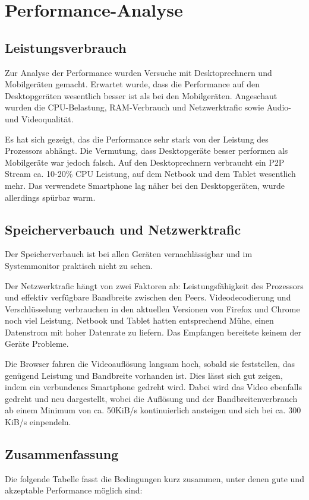 \chapter{Performance-Analyse}
	\section{Leistungsverbrauch}
		Zur Analyse der Performance wurden Versuche mit Desktoprechnern und Mobilgeräten gemacht. Erwartet wurde, dass die Performance auf den Desktopgeräten wesentlich besser ist als bei den Mobilgeräten.
		Angeschaut wurden die CPU-Belastung, RAM-Verbrauch und Netzwerktrafic sowie Audio- und Videoqualität.
		
		Es hat sich gezeigt, das die Performance sehr stark von der Leistung des Prozessors abhängt. Die Vermutung, dass Desktopgeräte besser performen als Mobilgeräte war jedoch falsch. 
		Auf den Desktoprechnern verbraucht ein P2P Stream ca. 10-20\% CPU Leistung, auf dem Netbook und dem Tablet wesentlich mehr. Das verwendete Smartphone lag näher bei den Desktopgeräten, wurde allerdings spürbar warm.	
		
		
	\section{Speicherverbauch und Netzwerktrafic}
		Der Speicherverbauch ist bei allen Geräten vernachlässigbar und im Systemmonitor praktisch nicht zu sehen.
		
		Der Netzwerktrafic hängt von zwei Faktoren ab: Leistungsfähigkeit des Prozessors und effektiv verfügbare Bandbreite zwischen den Peers.
		Videodecodierung und Verschlüsselung verbrauchen in den aktuellen Versionen von Firefox und Chrome noch viel Leistung. Netbook und Tablet hatten entsprechend Mühe, einen Datenstrom mit hoher Datenrate zu liefern. Das Empfangen bereitete keinem der Geräte Probleme.
		
		Die Browser fahren die Videoauflösung langsam hoch, sobald sie feststellen, das genügend Leistung und Bandbreite vorhanden ist. Dies lässt sich gut zeigen, indem ein verbundenes Smartphone gedreht wird. Dabei wird das Video ebenfalls gedreht und neu dargestellt, wobei die Auflösung und der Bandbreitenverbrauch ab einem Minimum von ca. 50KiB/s kontinuierlich ansteigen und sich bei ca. 300 KiB/s einpendeln.
	
	
	\section{Zusammenfassung}
		Die folgende Tabelle fasst die Bedingungen kurz zusammen, unter denen gute und akzeptable Performance möglich sind:

